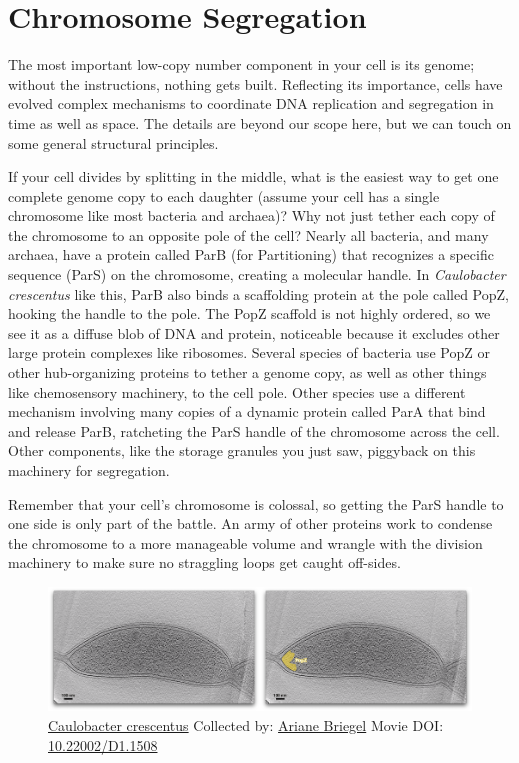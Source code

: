\documentclass[]{tufte-book}
\begin{document}
\section{Chromosome Segregation}\label{chromosome-segregation}

The most important low-copy number component in your cell is its genome;
without the instructions, nothing gets built. Reflecting its importance,
cells have evolved complex mechanisms to coordinate DNA replication and
segregation in time as well as space. The details are beyond our scope
here, but we can touch on some general structural principles.

If your cell divides by splitting in the middle, what is the easiest way
to get one complete genome copy to each daughter (assume your cell has a
single chromosome like most bacteria and archaea)? Why not just tether
each copy of the chromosome to an opposite pole of the cell? Nearly all
bacteria, and many archaea, have a protein called ParB (for
Partitioning) that recognizes a specific sequence (ParS) on the
chromosome, creating a molecular handle. In \emph{Caulobacter
crescentus} like this, ParB also binds a scaffolding protein at the pole
called PopZ, hooking the handle to the pole. The PopZ scaffold is not
highly ordered, so we see it as a diffuse blob of DNA and protein,
noticeable because it excludes other large protein complexes like
ribosomes. Several species of bacteria use PopZ or other hub-organizing
proteins to tether a genome copy, as well as other things like
chemosensory machinery, to the cell pole. Other species use a different
mechanism involving many copies of a dynamic protein called ParA that
bind and release ParB, ratcheting the ParS handle of the chromosome
across the cell. Other components, like the storage granules you just
saw, piggyback on this machinery for segregation.

Remember that your cell's chromosome is colossal, so getting the ParS
handle to one side is only part of the battle. An army of other proteins
work to condense the chromosome to a more manageable volume and wrangle
with the division machinery to make sure no straggling loops get caught
off-sides.





\begin{figure}
\includegraphics{movie_stills/5_2} \caption[\protect\hyperlink{tree}{Caulobacter crescentus} Collected by:
\protect\hyperlink{ariane_briegel}{Ariane Briegel} Movie DOI:
\href{https://doi.org/10.22002/D1.1508}{10.22002/D1.1508}]{\protect\hyperlink{tree}{Caulobacter crescentus} Collected by:
\protect\hyperlink{ariane_briegel}{Ariane Briegel} Movie DOI:
\href{https://doi.org/10.22002/D1.1508}{10.22002/D1.1508}}\label{fig:5-2}
\end{figure}
\end{document}
